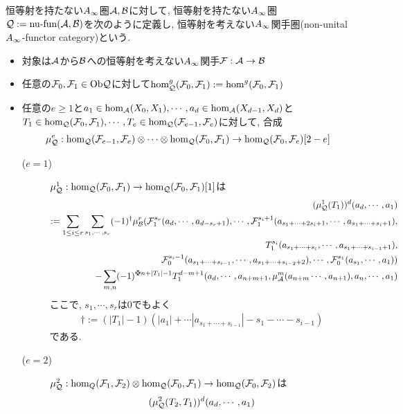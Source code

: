 \documentclass[uplatex, a4paper, 14Q, dvipdfmx]{jsarticle}
\begin{document}
\begin{definition}
  恒等射を持たない$A_{\infty}$圏$\mathcal{A},\mathcal{B}$に対して, 恒等射を持たない$A_{\infty}$圏$\mathcal{Q} := \mathrm{nu} \text{-} \mathrm{fun} (\mathcal{A}, \mathcal{B})$を次のように定義し, 恒等射を考えない$A_{\infty}$関手圏(non-unital $A_{\infty}$-functor category)という. 
  \begin{itemize}
    \item 対象は$\mathcal{A}$から$\mathcal{B}$への恒等射を考えない$A_{\infty}$関手$\mathcal{F} : \mathcal{A} \to \mathcal{B}$
    \item 任意の$\mathcal{F}_0,\mathcal{F}_1 \in \mathrm{Ob}\mathcal{Q}$に対して$\hom^g_{\mathcal{Q}}(\mathcal{F}_0,\mathcal{F}_1) := \hom^g(\mathcal{F}_0,\mathcal{F}_1)$
    \item 任意の$e \geq 1$と$a_1 \in \hom_{\mathcal{A}}(X_0,X_1), \cdots, a_d \in \hom_{\mathcal{A}}(X_{d-1},X_d)$と$T_1 \in \hom_{\mathcal{Q}}(\mathcal{F}_0,\mathcal{F}_1), \cdots, T_e \in \hom_{\mathcal{Q}}(\mathcal{F}_{e-1},\mathcal{F}_e)$に対して, 合成
    \begin{align*}
      \mu^e_{\mathcal{Q}} : \hom_{\mathcal{Q}}(\mathcal{F}_{e-1},\mathcal{F}_e) \otimes \cdots \otimes \hom_{\mathcal{Q}}(\mathcal{F}_0,\mathcal{F}_1) \to \hom_{\mathcal{Q}}(\mathcal{F}_0,\mathcal{F}_e)[2-e]
    \end{align*}
    \begin{description}
      \item[($e=1$)] $\mu^1_{\mathcal{Q}} : \hom_{\mathcal{Q}}(\mathcal{F}_0,\mathcal{F}_1) \to \hom_{\mathcal{Q}}(\mathcal{F}_0,\mathcal{F}_1)[1]$は 
      \begin{align*}
        (\mu^1_\Q(T_1))^d (a_d,\cdots,a_1) \\
        := \sum_{1 \leq i \leq r} \sum_{s_1,\cdots,s_r} (-1)^\dagger \mu^r_\B(\F^{s_r}_1(a_d,\cdots,a_{d-s_r+1}), \cdots, \F^{s_i+1}_1(a_{s_1+\cdots+2s_i+1}, \cdots, a_{s_1+\cdots+s_i+1}), \\
        T^{s_i}_1(a_{s_1+\cdots+s_i}, \cdots, a_{s_1+\cdots+s_{i-1}+1}), \\
        \F^{s_i-1}_0(a_{s_1+\cdots+s_{i-1}}, \cdots, a_{s_1+\cdots+s_{i-2}+2}), \cdots, \F^{s_1}_0(a_{s_1},\cdots,a_1)
        ) \\
        - \sum_{m,n} (-1)^{\maltese n+|T_1|-1} T^{d-m+1}_1 (a_d,\cdots,a_{n+m+1}, \mu^m_\A(a_{n+m} \cdots, a_{n+1}), a_n,\cdots,a_1)
      \end{align*}
      ここで, $s_1,\cdots,s_r$は$0$でもよく
      \begin{align*}
        \dagger
        := (|T_1|-1)(|a_1|+\cdots|a_{s_1+\cdots+s_{i-1}}|-s_1-\cdots-s_{i-1})
      \end{align*}
      である. 
      \item[($e=2$)] $\mu^2_{\mathcal{Q}} : \hom_Q(\mathcal{F}_1,\mathcal{F}_2) \otimes \hom_{\mathcal{Q}}(\mathcal{F}_0,\mathcal{F}_1) \to \hom_{\mathcal{Q}}(\mathcal{F}_0,\mathcal{F}_2)$は
      \begin{align*}
        (\mu^2_\Q(T_2,T_1))^d(a_d,\cdots,a_1) \\

\end{align*}
\end{description}
\end{itemize}
\end{definition}
\end{document}
